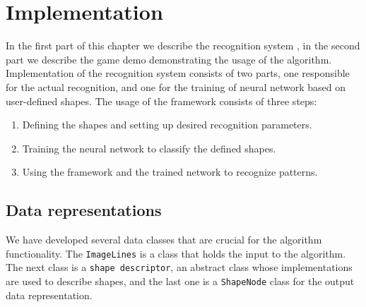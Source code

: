 \chapter{Implementation}
\label{ch:impl}
In the first part of this chapter we describe the recognition system , in the second part we describe the game demo  demonstrating the usage of the algorithm. Implementation of the recognition system consists of two parts, one responsible for the actual recognition, and one for the training of neural network based on user-defined shapes. The usage of the framework consists of three steps:
\begin{enumerate}
\item Defining the shapes and setting up desired recognition parameters.
\item Training the neural network to classify the defined shapes.
\item Using the framework and the trained network to recognize patterns.
\end{enumerate}

\section{Data representations}
We have developed several data classes that are crucial for the algorithm functionality. The \texttt{ImageLines} is a class that holds the input to the algorithm. The next class is a \texttt{shape descriptor}, an abstract class whose implementations are used to describe shapes, and the last one is a \texttt{ShapeNode} class for the output data representation.

